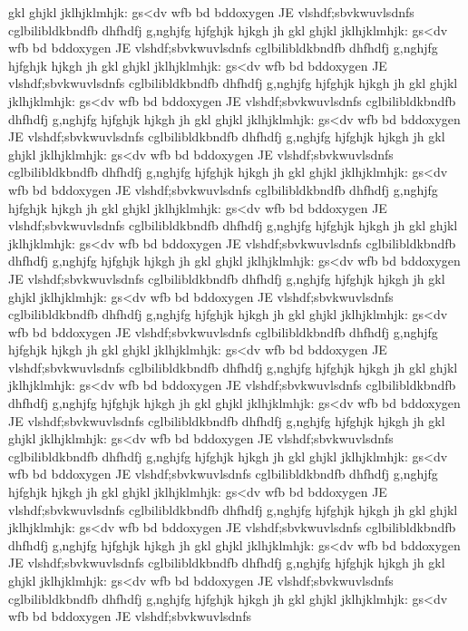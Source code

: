 gkl
ghjkl
jklhjklmhjk:
gs<dv
wfb
bd
bddoxygen
JE vlshdf;sbvkwuvlsdnfs
cglbilibldkbndfb
dhfhdfj
g,nghjfg
hjfghjk
hjkgh
jh
gkl
ghjkl
jklhjklmhjk:
gs<dv
wfb
bd
bddoxygen
JE vlshdf;sbvkwuvlsdnfs
cglbilibldkbndfb
dhfhdfj
g,nghjfg
hjfghjk
hjkgh
jh
gkl
ghjkl
jklhjklmhjk:
gs<dv
wfb
bd
bddoxygen
JE vlshdf;sbvkwuvlsdnfs
cglbilibldkbndfb
dhfhdfj
g,nghjfg
hjfghjk
hjkgh
jh
gkl
ghjkl
jklhjklmhjk:
gs<dv
wfb
bd
bddoxygen
JE vlshdf;sbvkwuvlsdnfs
cglbilibldkbndfb
dhfhdfj
g,nghjfg
hjfghjk
hjkgh
jh
gkl
ghjkl
jklhjklmhjk:
gs<dv
wfb
bd
bddoxygen
JE vlshdf;sbvkwuvlsdnfs
cglbilibldkbndfb
dhfhdfj
g,nghjfg
hjfghjk
hjkgh
jh
gkl
ghjkl
jklhjklmhjk:
gs<dv
wfb
bd
bddoxygen
JE vlshdf;sbvkwuvlsdnfs
cglbilibldkbndfb
dhfhdfj
g,nghjfg
hjfghjk
hjkgh
jh
gkl
ghjkl
jklhjklmhjk:
gs<dv
wfb
bd
bddoxygen
JE vlshdf;sbvkwuvlsdnfs
cglbilibldkbndfb
dhfhdfj
g,nghjfg
hjfghjk
hjkgh
jh
gkl
ghjkl
jklhjklmhjk:
gs<dv
wfb
bd
bddoxygen
JE vlshdf;sbvkwuvlsdnfs
cglbilibldkbndfb
dhfhdfj
g,nghjfg
hjfghjk
hjkgh
jh
gkl
ghjkl
jklhjklmhjk:
gs<dv
wfb
bd
bddoxygen
JE vlshdf;sbvkwuvlsdnfs
cglbilibldkbndfb
dhfhdfj
g,nghjfg
hjfghjk
hjkgh
jh
gkl
ghjkl
jklhjklmhjk:
gs<dv
wfb
bd
bddoxygen
JE vlshdf;sbvkwuvlsdnfs
cglbilibldkbndfb
dhfhdfj
g,nghjfg
hjfghjk
hjkgh
jh
gkl
ghjkl
jklhjklmhjk:
gs<dv
wfb
bd
bddoxygen
JE vlshdf;sbvkwuvlsdnfs
cglbilibldkbndfb
dhfhdfj
g,nghjfg
hjfghjk
hjkgh
jh
gkl
ghjkl
jklhjklmhjk:
gs<dv
wfb
bd
bddoxygen
JE vlshdf;sbvkwuvlsdnfs
cglbilibldkbndfb
dhfhdfj
g,nghjfg
hjfghjk
hjkgh
jh
gkl
ghjkl
jklhjklmhjk:
gs<dv
wfb
bd
bddoxygen
JE vlshdf;sbvkwuvlsdnfs
cglbilibldkbndfb
dhfhdfj
g,nghjfg
hjfghjk
hjkgh
jh
gkl
ghjkl
jklhjklmhjk:
gs<dv
wfb
bd
bddoxygen
JE vlshdf;sbvkwuvlsdnfs
cglbilibldkbndfb
dhfhdfj
g,nghjfg
hjfghjk
hjkgh
jh
gkl
ghjkl
jklhjklmhjk:
gs<dv
wfb
bd
bddoxygen
JE vlshdf;sbvkwuvlsdnfs
cglbilibldkbndfb
dhfhdfj
g,nghjfg
hjfghjk
hjkgh
jh
gkl
ghjkl
jklhjklmhjk:
gs<dv
wfb
bd
bddoxygen
JE vlshdf;sbvkwuvlsdnfs
cglbilibldkbndfb
dhfhdfj
g,nghjfg
hjfghjk
hjkgh
jh
gkl
ghjkl
jklhjklmhjk:
gs<dv
wfb
bd
bddoxygen
JE vlshdf;sbvkwuvlsdnfs
cglbilibldkbndfb
dhfhdfj
g,nghjfg
hjfghjk
hjkgh
jh
gkl
ghjkl
jklhjklmhjk:
gs<dv
wfb
bd
bddoxygen
JE vlshdf;sbvkwuvlsdnfs
cglbilibldkbndfb
dhfhdfj
g,nghjfg
hjfghjk
hjkgh
jh
gkl
ghjkl
jklhjklmhjk:
gs<dv
wfb
bd
bddoxygen
JE vlshdf;sbvkwuvlsdnfs
cglbilibldkbndfb
dhfhdfj
g,nghjfg
hjfghjk
hjkgh
jh
gkl
ghjkl
jklhjklmhjk:
gs<dv
wfb
bd
bddoxygen
JE vlshdf;sbvkwuvlsdnfs
cglbilibldkbndfb
dhfhdfj
g,nghjfg
hjfghjk
hjkgh
jh
gkl
ghjkl
jklhjklmhjk:
gs<dv
wfb
bd
bddoxygen
JE vlshdf;sbvkwuvlsdnfs
cglbilibldkbndfb
dhfhdfj
g,nghjfg
hjfghjk
hjkgh
jh
gkl
ghjkl
jklhjklmhjk:
gs<dv
wfb
bd
bddoxygen
JE vlshdf;sbvkwuvlsdnfs
